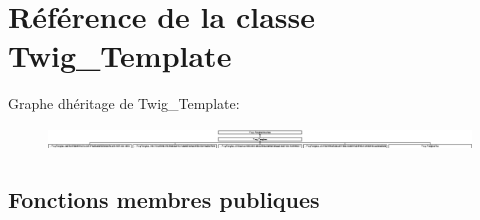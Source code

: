 \hypertarget{class_twig___template}{}\section{Référence de la classe Twig\+\_\+\+Template}
\label{class_twig___template}
Graphe d\textquotesingle{}héritage de Twig\+\_\+\+Template\+:\begin{figure}[H]
\begin{center}
\leavevmode
\includegraphics[height=0.601073cm]{class_twig___template}
\end{center}
\end{figure}
\subsection*{Fonctions membres publiques}
